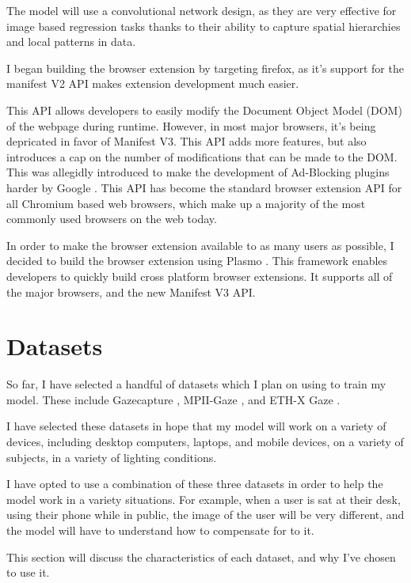 \documentclass[twocolumn]{report}
\begin{document}
The model will use a convolutional network design, as they are very effective for image based regression tasks thanks to their ability to capture spatial hierarchies and local patterns in data. 

I began building the browser extension by targeting firefox, as it's support for the manifest V2 API makes extension development much easier. 

This API allows developers to easily modify the Document Object Model (DOM) of the webpage during runtime. However, in most major browsers, it's being depricated in favor of Manifest V3. This API adds more features, but also introduces a cap on the number of modifications that can be made to the DOM. This was allegidly introduced to make the development of Ad-Blocking plugins harder by Google \cite{frisbe2022building}. This API has become the standard browser extension API for all Chromium based web browsers, which make up a majority of the most commonly used browsers on the web today. 

In order to make the browser extension available to as many users as possible, I decided to build the browser extension using Plasmo \cite{plasmo}. This framework enables developers to quickly build cross platform browser extensions. It supports all of the major browsers, and the new Manifest V3 API. 

\section{Datasets}

So far, I have selected a handful of datasets which I plan on using to train my model. These include Gazecapture \cite{krafka2016eye}, MPII-Gaze \cite{zhang15cvpr}, and ETH-X Gaze \cite{zhang2020ethxgaze}. 

I have selected these datasets in hope that my model will work on a variety of devices, including desktop computers, laptops, and mobile devices, on a variety of subjects, in a variety of lighting conditions. 

I have opted to use a combination of these three datasets in order to help the model work in a variety situations. For example, when a user is sat at their desk, using their phone while in public, the image of the user will be very different, and the model will have to understand how to compensate for to it.  

This section will discuss the characteristics of each dataset, and why I've chosen to use it. 
\end{document}
